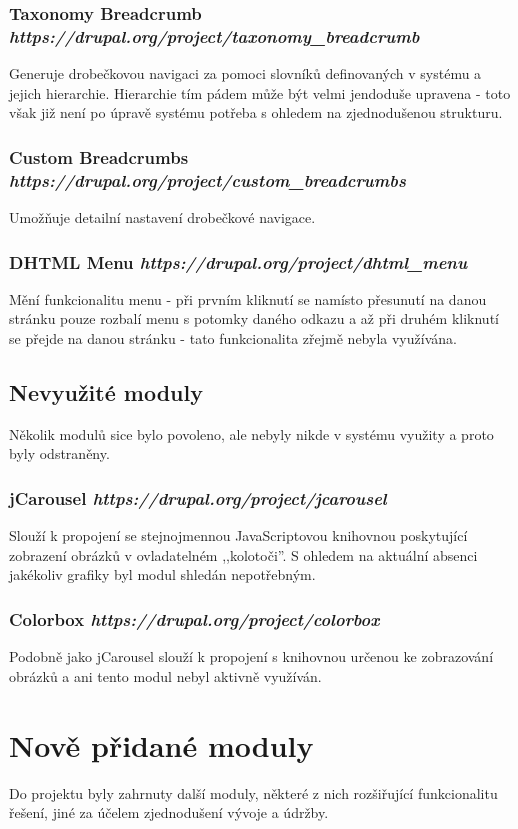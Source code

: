 \subsubsection*{Taxonomy Breadcrumb \hfill \emph{https://drupal.org/project/taxonomy\_breadcrumb}}
Generuje drobečkovou navigaci za pomoci slovníků definovaných v systému a jejich hierarchie. Hierarchie tím pádem může být velmi jendoduše upravena - toto však již není po úpravě systému potřeba s ohledem na zjednodušenou strukturu.

\subsubsection*{Custom Breadcrumbs \hfill \emph{https://drupal.org/project/custom\_breadcrumbs}}
Umožňuje detailní nastavení drobečkové navigace.

\subsubsection*{DHTML Menu \hfill \emph{https://drupal.org/project/dhtml\_menu}}
Mění funkcionalitu menu - při prvním kliknutí se namísto přesunutí na danou stránku pouze rozbalí menu s potomky daného odkazu a až při druhém kliknutí se přejde na danou stránku - tato funkcionalita zřejmě nebyla využívána.

\subsection{Nevyužité moduly}
Několik modulů sice bylo povoleno, ale nebyly nikde v systému využity a proto byly odstraněny.

\subsubsection*{jCarousel \hfill \emph{https://drupal.org/project/jcarousel}}
Slouží k propojení se stejnojmennou JavaScriptovou knihovnou poskytující zobrazení obrázků v ovladatelném ,,kolotoči''. S ohledem na aktuální absenci jakékoliv grafiky byl modul shledán nepotřebným.
 
\subsubsection*{Colorbox \hfill \emph{https://drupal.org/project/colorbox}}
Podobně jako jCarousel slouží k propojení s knihovnou určenou ke zobrazování obrázků a ani tento modul nebyl aktivně využíván.

\section{Nově přidané moduly}
\label{sec:nove-moduly}
Do projektu byly zahrnuty další moduly, některé z nich rozšiřující funkcionalitu řešení, jiné za účelem zjednodušení vývoje a údržby.

